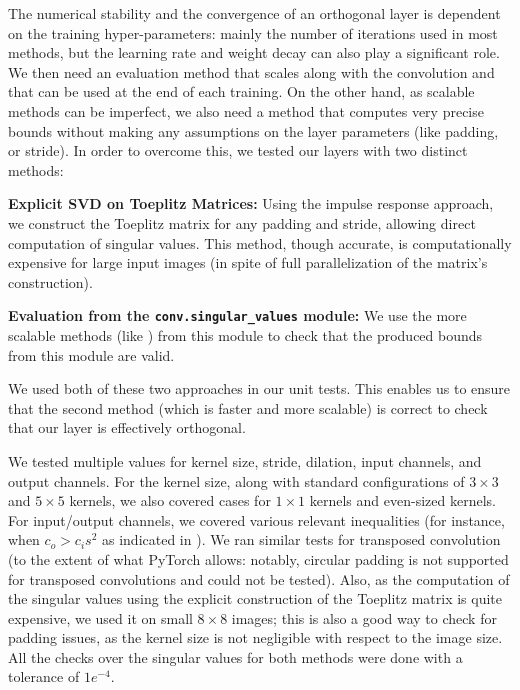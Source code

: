 \documentclass[10pt]{article}
\theoremstyle{plain}
\theoremstyle{definition}
\theoremstyle{remark}
\begin{document}
    The numerical stability and the convergence of an orthogonal layer is dependent on the training hyper-parameters: mainly the number of iterations used in most methods, but the learning rate and weight decay can also play a significant role. We then need an evaluation method that scales along with the convolution and that can be used at the end of each training. On the other hand, as scalable methods can be imperfect, we also need a method that computes very precise bounds without making any assumptions on the layer parameters (like padding, or stride). In order to overcome this, we tested our layers with two distinct methods:
    
    \textbf{Explicit SVD on Toeplitz Matrices:} Using the impulse response approach, we construct the Toeplitz matrix for any padding and stride, allowing direct computation of singular values. This method, though accurate, is computationally expensive for large input images (in spite of full parallelization of the matrix's construction).
    
    \textbf{Evaluation from the \texttt{conv.singular\_values} module:} We use the more scalable methods (like \cite{delattre2023efficient, delattre2024spectral, grishina_tight_2024}) from this module to check that the produced bounds from this module are valid.
    
    We used both of these two approaches in our unit tests. This enables us to ensure that the second method (which is faster and more scalable) is correct to check that our layer is effectively orthogonal. 

    We tested multiple values for kernel size, stride, dilation, input channels, and output channels. For the kernel size, along with standard configurations of $3 \times 3$ and $5 \times 5$ kernels, we also covered cases for $1 \times 1$ kernels and even-sized kernels. For input/output channels, we covered various relevant inequalities (for instance, when $c_o > c_is^2$ as indicated in \cite{achour2022existence}).
    We ran similar tests for transposed convolution (to the extent of what PyTorch allows: notably, circular padding is not supported for transposed convolutions and could not be tested). Also, as the computation of the singular values using the explicit construction of the Toeplitz matrix is quite expensive, we used it on small $8 \times 8$ images; this is also a good way to check for padding issues, as the kernel size is not negligible with respect to the image size. All the checks over the singular values for both methods were done with a tolerance of $1e^{-4}$. 
\end{document}
